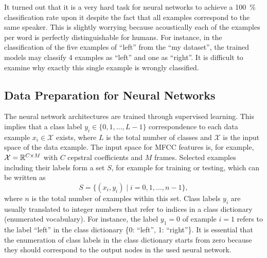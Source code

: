 \FloatBarrier
\noindent
It turned out that it is a very hard task for neural networks to achieve a \SI{100}{\percent} classification rate upon it despite the fact that all examples correspond to the same speaker.
This is slightly worrying because acoustically each of the examples per word is perfectly distinguishable for humans.
For instance, in the classification of the five examples of \enquote{left} from the \enquote{my dataset}, the trained models may classify 4 examples as \enquote{left} and one as \enquote{right}.
It is difficult to examine why exactly this single example is wrongly classified.



\subsection{Data Preparation for Neural Networks}\label{sec:exp_data_prep}
The neural network architectures are trained through supervised learning.
This implies that a class label $y_i \in \{0, 1, \dots, L - 1\}$ correspondence to each data example $x_i \in \mathcal{X}$ exists, where $L$ is the total number of classes and $\mathcal{X}$ is the input space of the data example.
The input space for MFCC features is, for example, $\mathcal{X} = \mathbb{R}^{C \times M}$ with $C$ cepstral coefficients and $M$ frames.
Selected examples including their labels form a set $S$, for example for training or testing, which can be written as
\begin{equation}\label{eq:exp_dataset}
  S = \{ (x_i, y_i) \mid i = 0, 1, \dots, n - 1 \},
\end{equation}
where $n$ is the total number of examples within this set.
Class labels $y_i$ are usually translated to integer numbers that refer to indices in a class dictionary (enumerated vocabulary).
For instance, the label $y_1 = 0$ of example $i=1$ refers to the label \enquote{left} in the class dictionary \{0: \enquote{left}, 1: \enquote{right}\}.
It is essential that the enumeration of class labels in the class dictionary starts from zero because they should correspond to the output nodes in the used neural network.

